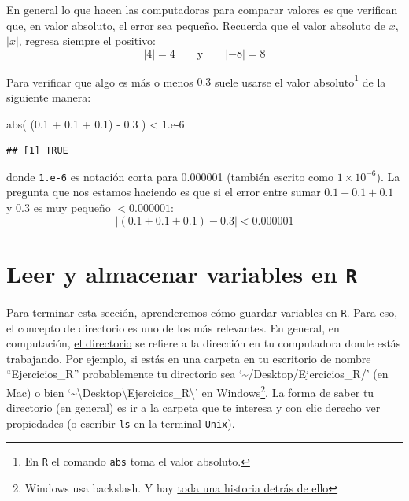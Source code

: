 \documentclass[
]{book}
\newenvironment{Shaded}{\begin{snugshade}}{\end{snugshade}}
\newcommand{\DecValTok}[1]{\textcolor[rgb]{0.00,0.00,0.81}{#1}}
\newcommand{\FloatTok}[1]{\textcolor[rgb]{0.00,0.00,0.81}{#1}}
\newcommand{\FunctionTok}[1]{\textcolor[rgb]{0.00,0.00,0.00}{#1}}
\newcommand{\NormalTok}[1]{#1}
\newcommand{\SpecialCharTok}[1]{\textcolor[rgb]{0.00,0.00,0.00}{#1}}
\begin{document}
En general lo que hacen las computadoras para comparar valores es que verifican que, en valor absoluto, el error sea pequeño. Recuerda que el valor absoluto de \(x\), \(|x|\), regresa siempre el positivo:
\[
|4| = 4 \qquad \textrm{y} \qquad |-8| = 8
\]

Para verificar que algo es más o menos \(0.3\) suele usarse el valor absoluto\footnote{En \texttt{R} el comando \texttt{abs} toma el valor absoluto.} de la siguiente manera:

\begin{Shaded}
\begin{Highlighting}[]
\FunctionTok{abs}\NormalTok{( (}\FloatTok{0.1} \SpecialCharTok{+} \FloatTok{0.1} \SpecialCharTok{+} \FloatTok{0.1}\NormalTok{) }\SpecialCharTok{{-}} \FloatTok{0.3}\NormalTok{ ) }\SpecialCharTok{\textless{}} \DecValTok{1}\NormalTok{.e}\DecValTok{{-}6}
\end{Highlighting}
\end{Shaded}

\begin{verbatim}
## [1] TRUE
\end{verbatim}

donde \texttt{1.e-6} es notación corta para 0.000001 (también escrito como \(1\times 10^{-6}\)). La pregunta que nos estamos haciendo es que si el error entre sumar \(0.1+0.1+0.1\) y \(0.3\) es muy pequeño \(< 0.000001\):
\[
| (0.1 + 0.1 + 0.1) - 0.3 | < 0.000001
\]

\hypertarget{leer-y-almacenar-variables-en-r}{%
\section{\texorpdfstring{Leer y almacenar variables en \texttt{R}}{Leer y almacenar variables en R}}\label{leer-y-almacenar-variables-en-r}}

Para terminar esta sección, aprenderemos cómo guardar variables en \texttt{R}. Para eso, el concepto de directorio es uno de los más relevantes. En general, en computación, \href{https://en.wikipedia.org/wiki/Working_directory}{el directorio} se refiere a la dirección en tu computadora donde estás trabajando. Por ejemplo, si estás en una carpeta en tu escritorio de nombre ``Ejercicios\_R'' probablemente tu directorio sea `\textasciitilde/Desktop/Ejercicios\_R/' (en Mac) o bien `\textasciitilde\textbackslash Desktop\textbackslash Ejercicios\_R\textbackslash{}' en Windows\footnote{Windows usa backslash. Y hay \href{https://www.howtogeek.com/181774/why-windows-uses-backslashes-and-everything-else-uses-forward-slashes/}{toda una historia detrás de ello}}. La forma de saber tu directorio (en general) es ir a la carpeta que te interesa y con clic derecho ver propiedades (o escribir \texttt{ls} en la terminal \texttt{Unix}).
\end{document}
